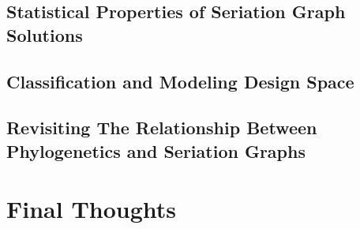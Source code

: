 \subsection{Statistical Properties of Seriation Graph Solutions}\label{conc:sec:future-seriation-structure}



\subsection{Classification and Modeling Design Space}\label{conc:sec:future-design-space}




\subsection{Revisiting The Relationship Between Phylogenetics and Seriation Graphs}\label{conc:sec:future-relationship-macro-meso}



\section{Final Thoughts}\label{conc:sec:final-thoughts}


